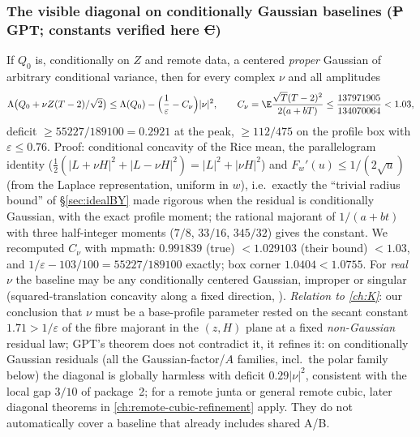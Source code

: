 \subsubsection{The visible diagonal on conditionally Gaussian baselines (\st{P} GPT; constants verified here \st{C})}\label{sec:knext-diag}
If $Q_0$ is, conditionally on $Z$ and remote data, a centered \emph{proper} Gaussian of arbitrary conditional variance, then for every complex $\nu$ and all amplitudes
\[
\Lambda\bigl(Q_0+\nu Z(T-2)/\sqrt2\bigr)\le\Lambda(Q_0)-\Bigl(\frac1\varepsilon-C_\nu\Bigr)|\nu|^2,\qquad C_\nu=\E\frac{\sqrt T(T-2)^2}{2(a+bT)}\le\frac{137971905}{134070064}<1.03,
\]
deficit $\ge55227/189100=0.2921$ at the peak, $\ge112/475$ on the profile box with $\varepsilon\le0.76$. Proof: conditional concavity of the Rice mean, the parallelogram identity
($\frac12(|L+\nu H|^2+|L-\nu H|^2)=|L|^2+|\nu H|^2$) and $F_w'(u)\le1/(2\sqrt u)$ (from the Laplace representation, uniform in $w$), i.e.\ exactly the ``trivial radius bound'' of
\S\ref{sec:idealBY} made rigorous when the residual is conditionally Gaussian, with the exact profile moment; the rational majorant of $1/(a+bt)$ with three half-integer moments
($7/8$, $33/16$, $345/32$) gives the constant. We recomputed $C_\nu$ with mpmath: $0.991839$ (true) $<1.029103$ (their bound) $<1.03$, and $1/\varepsilon-103/100=55227/189100$ exactly; box corner
$1.0404<1.0755$. For \emph{real} $\nu$ the baseline may be any conditionally centered Gaussian, improper or singular (squared-translation concavity along a fixed direction,
). \emph{Relation to \autoref{ch:K}}: our conclusion that $\nu$ must be a base-profile parameter rested on the secant constant $1.71>1/\varepsilon$ of
the fibre majorant in the $(z,H)$ plane at a fixed \emph{non-Gaussian} residual law; GPT's theorem does not contradict it, it refines it: on conditionally Gaussian residuals (all the
Gaussian-factor/$A$ families, incl.\ the polar family below) the diagonal is globally harmless with deficit $0.29|\nu|^2$, consistent with the local gap $3/10$ of package~2; for a remote junta or general remote cubic, later diagonal theorems in \autoref{ch:remote-cubic-refinement} apply. They do not automatically cover a baseline that already includes shared A/B.

